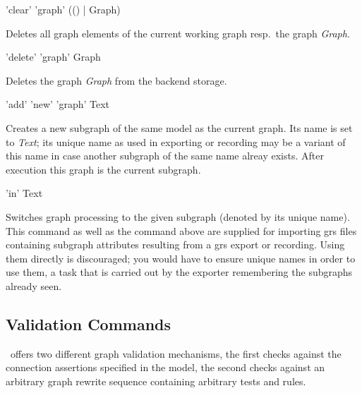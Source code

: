 \begin{rail}
  'clear' 'graph' (() | Graph)
\end{rail}
Deletes all graph elements of the current working graph resp.\ the graph \emph{Graph}.

\begin{rail}
  'delete' 'graph' Graph
\end{rail}
Deletes the graph \emph{Graph} from the backend storage.

\begin{rail}
  'add' 'new' 'graph' Text
\end{rail}
Creates a new subgraph of the same model as the current graph.
Its name is set to \emph{Text}; its unique name as used in exporting or recording may be a variant of this name in case another subgraph of the same name alreay exists.
After execution this graph is the current subgraph.

\begin{rail}
  'in' Text
\end{rail}
Switches graph processing to the given subgraph (denoted by its unique name).
This command as well as the command above are supplied for importing grs files containing subgraph attributes resulting from a grs export or recording.
Using them directly is discouraged; you would have to ensure unique names in order to use them, a task that is carried out by the exporter remembering the subgraphs already seen.

\subsection{Validation Commands}

\GrG\ offers two different graph validation mechanisms,
the first checks against the connection assertions specified in the model,
the second checks against an arbitrary graph rewrite sequence containing arbitrary tests and rules.

